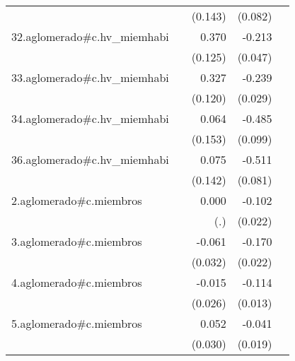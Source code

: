 {\begin{longtable}{l*{4}{D{.}{.}{-1}}}
            &                     &     (0.143)         &     (0.082)         &                     \\
\addlinespace
32.aglomerado#c.hv\_miemhabi&                     &       0.370\sym{**} &      -0.213\sym{***}&                     \\
            &                     &     (0.125)         &     (0.047)         &                     \\
\addlinespace
33.aglomerado#c.hv\_miemhabi&                     &       0.327\sym{**} &      -0.239\sym{***}&                     \\
            &                     &     (0.120)         &     (0.029)         &                     \\
\addlinespace
34.aglomerado#c.hv\_miemhabi&                     &       0.064         &      -0.485\sym{***}&                     \\
            &                     &     (0.153)         &     (0.099)         &                     \\
\addlinespace
36.aglomerado#c.hv\_miemhabi&                     &       0.075         &      -0.511\sym{***}&                     \\
            &                     &     (0.142)         &     (0.081)         &                     \\
\addlinespace
2.aglomerado#c.miembros&                     &       0.000         &      -0.102\sym{***}&                     \\
            &                     &         (.)         &     (0.022)         &                     \\
\addlinespace
3.aglomerado#c.miembros&                     &      -0.061         &      -0.170\sym{***}&                     \\
            &                     &     (0.032)         &     (0.022)         &                     \\
\addlinespace
4.aglomerado#c.miembros&                     &      -0.015         &      -0.114\sym{***}&                     \\
            &                     &     (0.026)         &     (0.013)         &                     \\
\addlinespace
5.aglomerado#c.miembros&                     &       0.052         &      -0.041\sym{*}  &                     \\
            &                     &     (0.030)         &     (0.019)         &                     \\

\end{longtable}}
